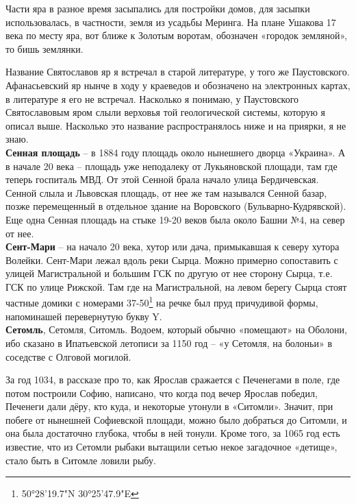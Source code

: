 Части яра в разное время засыпались для постройки домов, для засыпки использовалась, в частности, земля из усадьбы Меринга. На плане Ушакова 17 века по месту яра, вот ближе к Золотым воротам, обозначен «городок земляной», то бишь землянки.  

Название Святославов яр я встречал в старой литературе, у того же Паустовского. Афанасьевский яр нынче в ходу у краеведов и обозначено на электронных картах, в литературе я его не встречал. Насколько я понимаю, у Паустовского Святославовым яром слыли верховья той геологической системы, которую я описал выше. Насколько это название распространялось ниже и на приярки, я не знаю.\\


\textbf{Сенная площадь} – в 1884 году площадь около нынешнего дворца «Украина». А в начале 20 века – площадь уже неподалеку от Лукьяновской площади, там где теперь госпиталь МВД. От этой Сенной брала начало улица Бердичевская. Сенной слыла и Львовская площадь, от нее же там назывался Сенной базар, позже перемещенный в отдельное здание на Воровского (Бульварно-Кудрявской). Еще одна Сенная площадь на стыке 19-20 веков была около Башни №4, на север от нее.\\ 

\textbf{Сент-Мари} – на начало 20 века, хутор или дача, примыкавшая к северу хутора Волейки. Сент-Мари лежал вдоль реки Сырца. Можно примерно сопоставить с улицей Магистральной и большим ГСК по другую от нее сторону Сырца, т.е. ГСК по улице Рижской. Там где на Магистральной, на левом берегу Сырца стоят частные домики с номерами 37-50\footnote{50°28'19.7"N 30°25'47.9"E} на речке был пруд причудивой формы, напоминашей перевернутую букву Y.\\

\textbf{Сетомль}, Сетомля, Ситомль. Водоем, который обычно «помещают» на Оболони, ибо сказано в Ипатьевской летописи за 1150 год – «у Сетомля, на болоньи» в соседстве с Олговой могилой. 

За год 1034, в рассказе про то, как Ярослав сражается с Печенегами в поле, где потом построили Софию, написано, что когда под вечер Ярослав победил, Печенеги дали дёру, кто куда, и некоторые утонули в «Ситомли». Значит, при побеге от нынешней Софиевской площади, можно было добраться до Ситомли, и она была достаточно глубока, чтобы в ней тонули. Кроме того, за 1065 год есть известие, что из Сетомли рыбаки вытащили сетью некое загадочное «детище», стало быть в Ситомле ловили рыбу.

